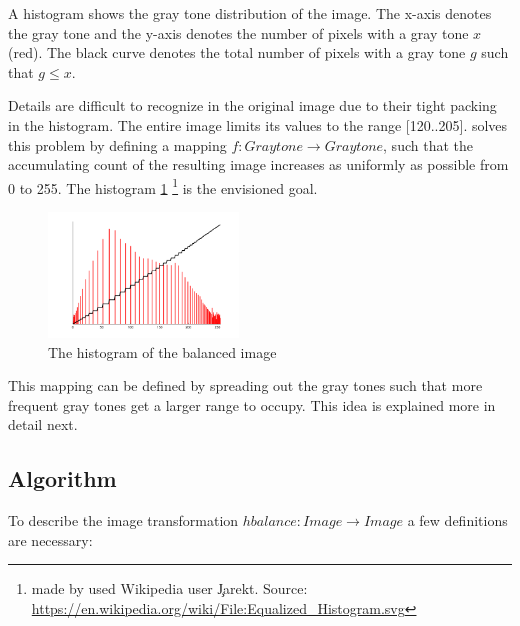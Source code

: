     A histogram shows the gray tone distribution of the image.
    The x-axis denotes the gray tone and the y-axis denotes the
    number of pixels with a gray tone $x$ (red). The black curve denotes the
    total number of pixels with a gray tone $g$ such that $g \leq x$.

    Details are difficult to recognize in the original image
    due to their tight packing in the histogram. The
    entire image limits its values to the range [120..205].
    \algo solves this problem by defining a mapping
    $f: Graytone \rightarrow Graytone$, such that the accumulating count
    of the resulting image increases as uniformly as possible from 0 to 255.
    The histogram \ref{fig:hist-eq}
    \footnote{made by used Wikipedia user \c{Jarekt}. Source: \url{https://en.wikipedia.org/wiki/File:Equalized_Histogram.svg}}
    is the envisioned goal.
    
    \begin{figure}[h]
      \centering
      \includegraphics[width=0.45\textwidth]{hist-eq}
      \caption{The histogram of the balanced image}
      \label{fig:hist-eq}
    \end{figure}
    This mapping can be defined by spreading out the gray tones such that more
    frequent gray tones get a larger range to occupy. This idea is
    explained more in detail next.
      
  \subsection*{Algorithm}
    To describe the image transformation $ hbalance: Image \rightarrow Image$ a few definitions are necessary:
    
